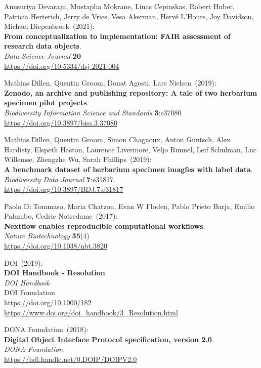 \begin{thebibliography}{9}
Anusuriya Devaraju, Mustapha Mokrane, Linas Cepinskas, Robert Huber, Patricia Herterich, Jerry de Vries, Vesa Akerman, Hervé L'Hours, Joy Davidson, Michael Diepenbroek~(2021): \\
\textbf{From conceptualization to implementation: FAIR assessment of research data objects}. \\
\emph{Data Science Journal} \textbf{20} \\
\url{https://doi.org/10.5334/dsj-2021-004}

Mathias Dillen, Quentin Groom, Donat Agosti, Lars Nielsen~(2019): \\
\textbf{Zenodo, an archive and publishing repository: A tale of two herbarium specimen pilot projects}.\\
\emph{Biodiversity Information Science and Standards} \textbf{3}:e37080\\
\url{https://doi.org/10.3897/biss.3.37080}

Mathias Dillen, Quentin Groom, Simon Chagnoux, Anton Güntsch, Alex Hardisty, Elspeth Haston, Laurence Livermore, Veljo Runnel, Leif Schulman, Luc Willemse, Zhengzhe Wu, Sarah Phillips~(2019): \\
\textbf{A benchmark dataset of herbarium specimen imagfes with label data}.\\
\emph{Biodiversity Data Journal} \textbf{7}:e31817.\\
\url{https://doi.org/10.3897/BDJ.7.e31817}

Paolo Di Tommaso, Maria Chatzou, Evan W Floden, Pablo Prieto Barja, Emilio Palumbo, Cedric Notredame~(2017): \\
\textbf{Nextflow enables reproducible computational workflows}.\\
\emph{Nature Biotechnology} \textbf{35}(4) \\
\url{https://doi.org/10.1038/nbt.3820}

DOI~(2019): \\
\textbf{{DOI Handbook} - {Resolution}}. \\
\emph{{DOI Handbook}}\\
DOI Foundation\\
\url{https://doi.org/10.1000/182}\\
\url{https://www.doi.org/doi_handbook/3_Resolution.html}

DONA Foundation~(2018): \\
\textbf{Digital Object Interface Protocol specification, version 2.0}.\\
\emph{DONA Foundation}\\
\url{https://hdl.handle.net/0.DOIP/DOIPV2.0}


\end{thebibliography}
